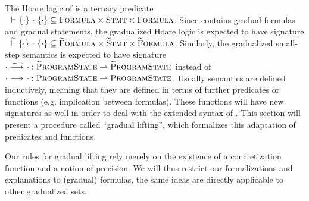 The Hoare logic of \svl is a ternary predicate ${~} \,\,{\vdash}\,\, \{{\cdot}\} ~{\cdot}~ \{{\cdot}\} \subseteq \textup{\textsc{Formula}} \times \textup{\textsc{Stmt}} \times \textup{\textsc{Formula}}$.
Since \gvl contains gradual formulas and gradual statements, the gradualized Hoare logic is expected to have signature ${~} \,\,\widetilde{\vdash}\,\, \{{\cdot}\} ~{\cdot}~ \{{\cdot}\} \subseteq \textup{\textsc{\ensuremath{\widetilde{\text{F}}}ormula}} \times \textup{\textsc{\ensuremath{\widetilde{\text{S}}}tmt}} \times \textup{\textsc{\ensuremath{\widetilde{\text{F}}}ormula}}$.
Similarly, the gradualized small-step semantics is expected to have signature ${\cdot} \,\,{\widetilde{\longrightarrow}^{}}\,\, {\cdot} : \textup{\textsc{\ensuremath{\widetilde{\text{P}}}rogramState}} \rightharpoonup \textup{\textsc{\ensuremath{\widetilde{\text{P}}}rogramState}}$ instead of ${\cdot} \,\,{\longrightarrow^{}}\,\, {\cdot} : \textup{\textsc{ProgramState}} \rightharpoonup \textup{\textsc{ProgramState}}$.
Usually semantics are defined inductively, meaning that they are defined in terms of further predicates or functions (e.g. implication between formulas).
These functions will have new signatures as well in order to deal with the extended syntax of \gvl.
This section will present a procedure called “gradual lifting”, which formalizes this adaptation of predicates and functions.

\begin{comment}[Gradual Lifting]
    The procedure of extending an existing predicate/function in order to deal with gradual formulas.
    The resulting predicate/function has the same signature as the original one, with occurrences of \setFormula, \setStmt and \setProgramState replaced by \setGFormula, \setGStmt, \setGProgramState.
\end{comment}

Our rules for gradual lifting rely merely on the existence of a concretization function and a notion of precision.
We will thus restrict our formalizations and explanations to (gradual) formulas, the same ideas are directly applicable to other gradualized sets.